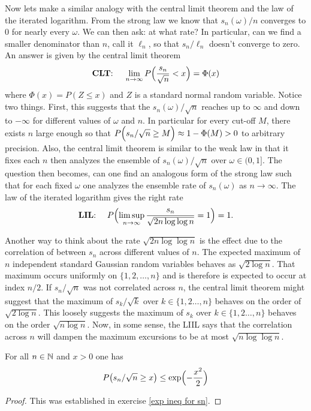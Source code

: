 Now lets make a similar analogy with the central limit theorem and the law of the iterated logarithm. From the strong law we know that   ${s_n(\omega)}/{n}$ converges to $0$ for nearly every $\omega$. We can then ask: at what rate? In particular, can we find a smaller denominator than $n$, call it $\ell_n$, so that  ${s_n}/{\ell_n}$ doesn't converge to zero. An answer is given by the central limit theorem
\[
\text{{\bf CLT}:   } \quad \lim_{n\rightarrow \infty} P\Bigl(\frac{s_n}{\sqrt{n}} < x \Bigr) = \Phi(x)
\]
where $\Phi(x) = P(Z\leq x)$ and $Z$ is a standard normal random variable. Notice two things. First, this suggests that the  ${s_n(\omega)}/{\sqrt{n}}$ reaches up to $\infty $ and down to $-\infty$ for different values of $\omega$ and $n$.
In particular for every cut-off $M$, there exists $n$ large enough so that $P\Bigl({s_n}/{\sqrt{n}} \geq M \Bigr)\approx 1- \Phi(M)>0$ to arbitrary precision.
Also, the central limit theorem is similar to the weak law in that it fixes each $n$ then analyzes the ensemble of $s_n(\omega)/\sqrt{n}$
over $\omega\in (0,1]$. The question then becomes, can one find an analogous form of the strong law such that  for each fixed $\omega$  one analyzes the ensemble rate of $s_n(\omega)$ as $n\rightarrow \infty$. The law of the iterated logarithm gives the right rate
\[
\text{{\bf LIL}:   } \quad P\Bigl(  \displaystyle\limsup_{n\rightarrow\infty} \frac{s_n}{\sqrt{2n\log\log n}} =1\Bigr)=1.
\]

Another way to think about the rate $\sqrt{2n\log \log n}$ is the effect due to the correlation of between $s_n$ across different values of $n$. The expected maximum of $n$ independent standard Gaussian random variables behaves as $\sqrt{2\log n}$. That maximum occurs uniformly on $\{1,2,\ldots, n \}$ and is therefore is expected to occur at index $n/2$.
If  $s_n/\sqrt{n}$ was not correlated across $n$, the central limit theorem might suggest that the maximum of $s_k/\sqrt{k}$ over $k\in \{1,2\ldots, n \}$ behaves on the order of $\sqrt{2\log n}$. This loosely suggests the maximum of $s_k$ over $k\in \{1,2\ldots, n \}$  behaves on the order $\sqrt{ n\log n}$. Now, in some sense, the LIIL says that the  correlation across $n$ will dampen the maximum excursions to be at most $\sqrt{ n\log \log n}$.

\begin{lemma}
\label{LIL: usefull lemma 1}
For all $n\in \Bbb N$ and $x>0$ one has
\[
P\bigl(s_n/\sqrt{n} \geq x\bigr)\leq \exp\Bigl( -\frac{x^2}{2} \Bigr)
\]
\end{lemma}
\begin{proof} This was established in exercise \ref{exp ineq for sn}.
\end{proof}

